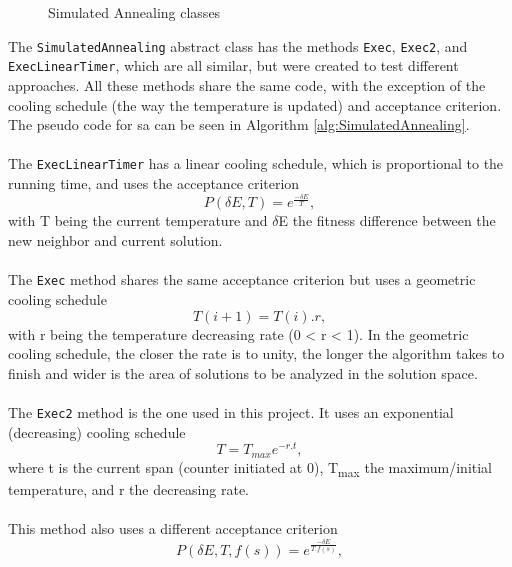 \begin{figure}[p]

\caption{Simulated Annealing classes} 
\label{fig:SimulatedAnnealing}
\end{figure}
The \verb+SimulatedAnnealing+ abstract class has the methods \verb+Exec+, \verb+Exec2+, and \verb+ExecLinearTimer+, which are all similar, but were created to test different approaches. All these methods share the same code, with the exception of the cooling schedule (the way the temperature is updated) and acceptance criterion. The pseudo code for \gls{sa} can be seen in Algorithm \ref{alg:SimulatedAnnealing}.\\
\\
The \verb+ExecLinearTimer+ has a linear cooling schedule, which is proportional to the running time, and uses the acceptance criterion
\begin{equation}
P(\delta E, T) = e^{\frac{-\delta E}{T}},
\end{equation} with T being the current temperature and $\delta$E the fitness difference between the new neighbor and current solution.\\
\\
The \verb+Exec+ method shares the same acceptance criterion but uses a geometric cooling schedule \begin{equation}
T (i+1) = T(i).r,
\end{equation}with r being the temperature decreasing rate (0 < r < 1). In the geometric cooling schedule, the closer the rate is to unity, the longer the algorithm takes to finish and wider is the area of solutions to be analyzed in the solution space.\\
\\
The \verb+Exec2+ method is the one used in this project. It uses an exponential (decreasing) cooling schedule \cite{CarvalhoLisbonNovember2004}\\
\begin{equation} 
T = T_{max}e^{-r.t},
\end{equation}
where t is the current span (counter initiated at 0), T\textsubscript{max} the maximum/initial temperature, and r the decreasing rate.\\
\\
This method also uses a different acceptance criterion \begin{equation} P(\delta E, T, f(s)) = e^{\frac{-\delta E}{T.f(s)}},
\end{equation}
